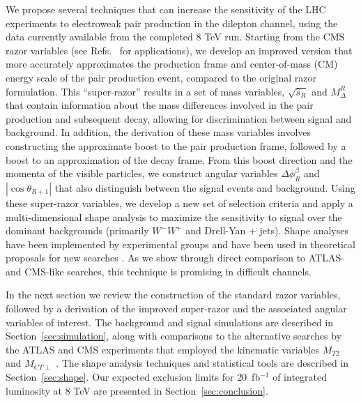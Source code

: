 
We propose several techniques that can increase the sensitivity of the LHC experiments to electroweak pair production in the dilepton channel, using the data currently available from the completed 8 TeV run. Starting from the CMS razor variables \cite{Rogan:2010kb,Chatrchyan:2011ek} (see Refs.~\cite{Fox:2012ee,CMS:2012dwa,Chatrchyan:2012gq} for applications), 
we develop an improved version that more accurately approximates the production frame and center-of-mass (CM) energy scale of the pair production event, compared to the original razor formulation. This ``super-razor'' results in a set of mass variables, $\sqrt{\hat{s}_R}$ and $M_\Delta^R$ that contain information about the mass differences involved in the pair production and subsequent decay, allowing for discrimination between signal and background. In addition, the derivation of these mass variables involves constructing the approximate boost to the pair production frame, followed by a boost to an approximation of the decay frame. From this boost direction and the momenta of the visible particles, we construct angular variables $\Delta\phi_R^{\beta}$ and $|\cos\theta_{R+1}|$ that also distinguish between the signal events and background. Using these super-razor variables, we develop a new set of selection criteria and apply a multi-dimensional shape analysis to maximize the sensitivity to signal over the dominant backgrounds (primarily $W^-W^+$ and Drell-Yan + jets).  Shape analyses have been implemented by experimental groups \cite{Rogan:2010kb,CMS:2012dwa} and have been used in theoretical proposals for new searches \cite{Alves:2012ft,Fox:2012ee}. As we show through direct comparison to ATLAS- and CMS-like searches, this technique is promising in difficult channels.

In the next section we review the construction of the standard razor variables, followed by a derivation of the improved super-razor and the associated angular variables of interest. The background and signal simulations are described in Section~\ref{sec:simulation}, along with comparisons to the alternative searches by the ATLAS and CMS experiments that employed the kinematic variables $M_{T2}$ \cite{Lester:1999tx,Barr:2003rg} and $M_{CT\perp}$ \cite{Matchev:2009ad,Tovey:2008ui}. The shape analysis techniques and statistical tools are described in Section~\ref{sec:shape}. Our expected exclusion limits for 20~fb$^{-1}$ of integrated luminosity at 8 TeV are presented in Section~\ref{sec:conclusion}.

